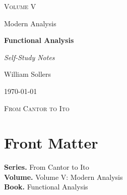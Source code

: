 \documentclass[12pt, a4paper]{report}
\begin{document}
\ExplSyntaxOff
\renewcommand{\familydefault}{\rmdefault}

\begin{titlepage}
\centering
\vspace*{3.5cm}

{\Large\scshape Volume V\par}
\vspace{0.35cm}
{\large Modern Analysis\par}

\vspace{1.4cm}

{\Huge\bfseries Functional Analysis\par}

\vspace{0.6cm}
{\large\itshape Self-Study Notes\par}

\vfill

{\large William Sollers\par}
\vspace{0.35cm}
{\large \today\par}

\vfill

{\large\scshape From Cantor to Ito\par}
\end{titlepage}

\clearpage
\thispagestyle{plain}
\chapter*{Front Matter}
\noindent\textbf{Series.} From Cantor to Ito\\[0.5em]
\textbf{Volume.} Volume V: Modern Analysis\\[0.5em]
\textbf{Book.} Functional Analysis

\clearpage
\tableofcontents
\clearpage
{}



\clearpage



\printindex[tech]
\printindex[dep]
\end{document}
